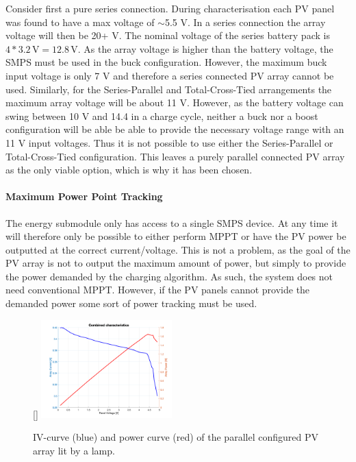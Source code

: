 \documentclass[a4paper]{article}
\newcommand{\unit}[1]{\ensuremath{\, \mathrm{#1}}}
\begin{document}
Consider first a pure series connection. During characterisation each PV 
panel was found to have a max voltage of  $\sim$5.5 V. In a series 
connection the array voltage will then be 20+ V. The nominal voltage of 
the series battery pack is \(4 * 3.2 \unit{V} = 12.8 \unit{V} \). As the 
array voltage is higher than the battery voltage, the SMPS must be used 
in the buck configuration. However, the maximum buck input voltage is 
only 7 V\cite{PMOS} and therefore a series connected PV array cannot be 
used. Similarly, for the Series-Parallel and Total-Cross-Tied arrangements 
the maximum array voltage will be about 11 V. However, as the battery 
voltage can swing between 10 V and 14.4 in a charge cycle, neither a 
buck nor a boost configuration will be able be able to provide the 
necessary voltage range with an 11 V input voltages. Thus it is not 
possible to use either the Series-Parallel or Total-Cross-Tied 
configuration. This leaves a purely parallel connected PV array as 
the only viable option, which is why it has been chosen. 

\paragraph*{Maximum Power Point Tracking}
\vspace{-6pt}
The energy submodule only has access to a single SMPS device. At any time it 
will therefore only be possible to either perform MPPT or have the PV power 
be outputted at the correct current/voltage. This is not a problem, as the 
goal of the PV array is not to output the maximum amount of power, but simply 
to provide the power demanded by the charging algorithm. As such, the system 
does not need conventional MPPT. However, if the PV panels cannot provide the 
demanded power some sort of power tracking must be used. 

\begin{figure}
    \centering
    \raisebox{-5pt}[\dimexpr{}\baselineskip\relax]{%
        \includegraphics[width=0.45\textwidth]{Combined.png}
    }%
    \vspace{-15pt}
    \caption{IV-curve (blue) and power curve (red) of the parallel configured PV array lit by a lamp.}
    \label{fig:parallelArray}
\end{figure}
\end{document}
